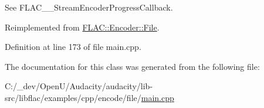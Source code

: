 See F\+L\+A\+C\+\_\+\+\_\+\+Stream\+Encoder\+Progress\+Callback. 



Reimplemented from \hyperlink{class_f_l_a_c_1_1_encoder_1_1_file_a296c7f44291dbf7389295d006f4d381d}{F\+L\+A\+C\+::\+Encoder\+::\+File}.



Definition at line 173 of file main.\+cpp.



The documentation for this class was generated from the following file\+:\begin{DoxyCompactItemize}
\item 
C\+:/\+\_\+dev/\+Open\+U/\+Audacity/audacity/lib-\/src/libflac/examples/cpp/encode/file/\hyperlink{lib-src_2libflac_2examples_2cpp_2encode_2file_2main_8cpp}{main.\+cpp}\end{DoxyCompactItemize}
